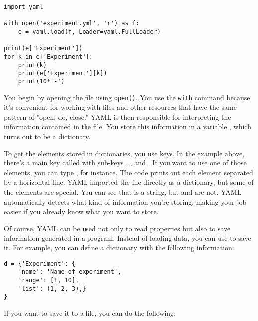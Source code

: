 \begin{verbatim}
import yaml

with open('experiment.yml', 'r') as f:
    e = yaml.load(f, Loader=yaml.FullLoader)

print(e['Experiment'])
for k in e['Experiment']:
    print(k)
    print(e['Experiment'][k])
    print(10*'-')
\end{verbatim}

You begin by opening the file using \texttt{open()}. You use the \texttt{with} command because it's convenient for working with files and other resources that have the same pattern of "open, do, close." YAML is then responsible for interpreting the information contained in the file. You store this information in a variable , which turns out to be a dictionary.

To get the elements stored in dictionaries, you use keys. In the example above, there's a main key called  with sub-keys , , and . If you want to use one of those elements, you can type , for instance. The code prints out each element separated by a horizontal line. YAML imported the file directly as a dictionary, but some of the elements are special. You can see that  is a string, but  and  are not. {YAML} automatically detects what kind of information you're storing, making your job easier if you already know what you want to store.



Of course, YAML can be used not only to read properties but also to save information generated in a program. Instead of loading data, you can use  to save it. For example, you can define a dictionary with the following information:

\begin{verbatim}
d = {'Experiment': {
    'name': 'Name of experiment',
    'range': [1, 10],
    'list': (1, 2, 3),}
}
\end{verbatim}

If you want to save it to a file, you can do the following:

